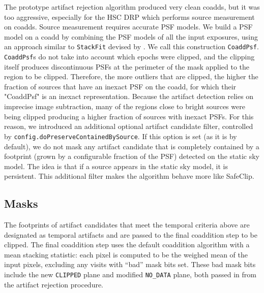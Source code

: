 \documentclass[DM,authoryear,toc]{lsstdoc}
\begin{document}
The prototype artifact rejection algorithm produced very clean coadds, but it was too aggressive, especially for the HSC DRP which performs source measurement on coadds.
Source measurement requires accurate PSF models.
We build a PSF model on a coadd by combining the PSF models of all the input exposures, using an approach similar to  \texttt{StackFit} devised by \citet{Jee2013}.
We call this construction \texttt{CoaddPsf}.
\texttt{CoaddPsf}s do not take into account which epochs were clipped, and the clipping itself produces discontinuous PSFs at the perimeter of the mask applied to the region to be clipped.
Therefore, the more outliers that are clipped, the higher the fraction of sources that have an inexact PSF on the coadd, for which their "CoaddPsf" is an inexact representation.
Because the artifact detection relies on imprecise image subtraction, many of the regions close to bright sources were being clipped producing a higher fraction of sources with inexact PSFs.
For this reason, we introduced an additional optional artifact candidate filter, controlled by \texttt{config.doPreserveContainedBySource}.
If this option is set (as it is by default), we do not mask any artifact candidate that is completely contained by a footprint (grown by a configurable fraction of the PSF)  detected on the static sky model.
The idea is that if a source appears in the static sky model, it is persistent.
This additional filter makes the algorithm behave more like SafeClip.


\subsection{Masks}
\label{sec:masks}
The footprints of artifact candidates that meet the temporal criteria above are designated as temporal artifacts and are passed to the final coaddition step to be clipped.
The final coaddition step uses the default coaddition algorithm with a mean stacking statistic: each pixel is computed to be the weighed mean of the input pixels, excluding any visits with ``bad'' mask bits set.
These bad mask bits include the new \texttt{CLIPPED} plane and modified \texttt{NO\_DATA} plane, both passed in from the artifact rejection procedure.
\end{document}
